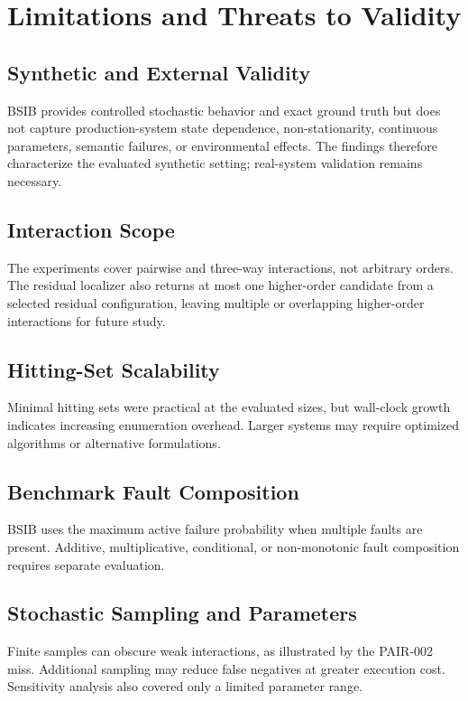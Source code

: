 \section{Limitations and Threats to Validity}

\subsection{Synthetic and External Validity}

BSIB provides controlled stochastic behavior and exact ground truth but does not capture production-system state dependence, non-stationarity, continuous parameters, semantic failures, or environmental effects. The findings therefore characterize the evaluated synthetic setting; real-system validation remains necessary.

\subsection{Interaction Scope}

The experiments cover pairwise and three-way interactions, not arbitrary orders. The residual localizer also returns at most one higher-order candidate from a selected residual configuration, leaving multiple or overlapping higher-order interactions for future study.

\subsection{Hitting-Set Scalability}

Minimal hitting sets were practical at the evaluated sizes, but wall-clock growth indicates increasing enumeration overhead. Larger systems may require optimized algorithms or alternative formulations.

\subsection{Benchmark Fault Composition}

BSIB uses the maximum active failure probability when multiple faults are present. Additive, multiplicative, conditional, or non-monotonic fault composition requires separate evaluation.

\subsection{Stochastic Sampling and Parameters}

Finite samples can obscure weak interactions, as illustrated by the PAIR-002 miss. Additional sampling may reduce false negatives at greater execution cost. Sensitivity analysis also covered only a limited parameter range.

